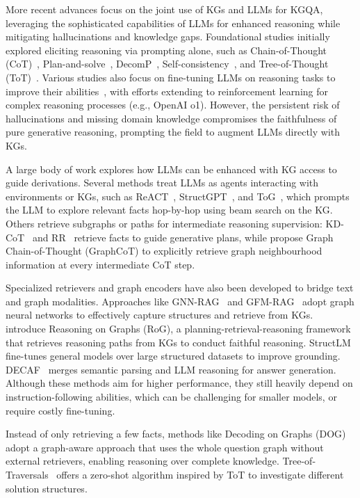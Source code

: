 More recent advances focus on the joint use of KGs and LLMs for KGQA, leveraging the sophisticated capabilities of LLMs for enhanced reasoning while mitigating hallucinations and knowledge gaps. Foundational studies initially explored eliciting reasoning via prompting alone, such as Chain-of-Thought (CoT)~\citep{wei2022cot}, Plan-and-solve~\citep{wang2023c}, DecomP~\citep{khot2023decomposed}, Self-consistency~\citep{wang2023-self-consistency}, and Tree-of-Thought (ToT)~\citep{yao2023-tree-of-thought}. Various studies also focus on fine-tuning LLMs on reasoning tasks to improve their abilities~\citep{hoffman2024}, with efforts extending to reinforcement learning for complex reasoning processes (e.g., OpenAI o1). However, the persistent risk of hallucinations and missing domain knowledge compromises the faithfulness of pure generative reasoning, prompting the field to augment LLMs directly with KGs.

A large body of work explores how LLMs can be enhanced with KG access to guide derivations. Several methods treat LLMs as agents interacting with environments or KGs, such as ReACT~\citep{yao2022react}, StructGPT~\citep{jiang2023structgpt}, and ToG~\citep{sun2024tog}, which prompts the LLM to explore relevant facts hop-by-hop using beam search on the KG. Others retrieve subgraphs or paths for intermediate reasoning supervision: KD-CoT~\citep{wang2023knowledgedrivencotexploringfaithful} and RR~\citep{he2022rethinking} retrieve facts to guide generative plans, while \citet{jin2024graphcot} propose Graph Chain-of-Thought (GraphCoT) to explicitly retrieve graph neighbourhood information at every intermediate CoT step.

Specialized retrievers and graph encoders have also been developed to bridge text and graph modalities. Approaches like GNN-RAG~\citep{mavromatis2024gnnrag} and GFM-RAG~\citep{luo2025gfmrag} adopt graph neural networks to effectively capture structures and retrieve from KGs. \citet{luo2024rog} introduce Reasoning on Graphs (RoG), a planning-retrieval-reasoning framework that retrieves reasoning paths from KGs to conduct faithful reasoning. StructLM~\citep{zhuang2024structlm} fine-tunes general models over large structured datasets to improve grounding. DECAF~\citep{yu2023decaf} merges semantic parsing and LLM reasoning for answer generation. Although these methods aim for higher performance, they still heavily depend on instruction-following abilities, which can be challenging for smaller models, or require costly fine-tuning.

Instead of only retrieving a few facts, methods like Decoding on Graphs (DOG)~\citep{li2024-decoding-on-graphs} adopt a graph-aware approach that uses the whole question graph without external retrievers, enabling reasoning over complete knowledge. Tree-of-Traversals~\citep{markowitz-etal-2024-tree} offers a zero-shot algorithm inspired by ToT to investigate different solution structures.


